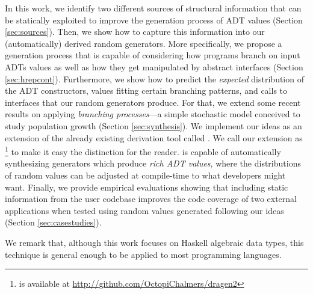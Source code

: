 In this work, we identify two different sources of structural information that
can be statically exploited to improve the generation process of ADT values
(Section \ref{sec:sources}).
%
%
Then, we show how to capture this information into our (automatically) derived
random generators.
%
More specifically, we propose a generation process that is capable of
considering how programs branch on input ADTs values as well as how they get
manipulated by abstract interfaces (Section \ref{sec:hrepcont}).
%
Furthermore, we show how to predict the \emph{expected} distribution of the ADT
constructors, values fitting certain branching patterns, and calls to interfaces
that our random generators produce.
%
For that, we extend some recent results on applying \emph{branching
  processes}\cite{gw1875}---a simple stochastic model conceived to study
population growth (Section \ref{sec:synthesis}).
%
%
We implement our ideas as an extension of the already existing derivation tool
called \dragen\cite{DBLP:conf/haskell/MistaRH18}. We call our extension as
\dragenp\footnote{\dragenp is available at
  \url{http://github.com/OctopiChalmers/dragen2}} to make it easy the
distinction for the reader.
%
\dragenp is capable of automatically synthesizing \quickcheck generators which
produce \emph{rich ADT values}, where the distributions of random values can be
adjusted at compile-time to what developers might want.
%
Finally, we provide empirical evaluations showing that including static
information from the user codebase improves the code coverage of two external
applications when tested using random values generated following our ideas
(Section \ref{sec:casestudies}).


We remark that, although this work focuses on Haskell algebraic data types, this
technique is general enough to be applied to most programming languages.
%


